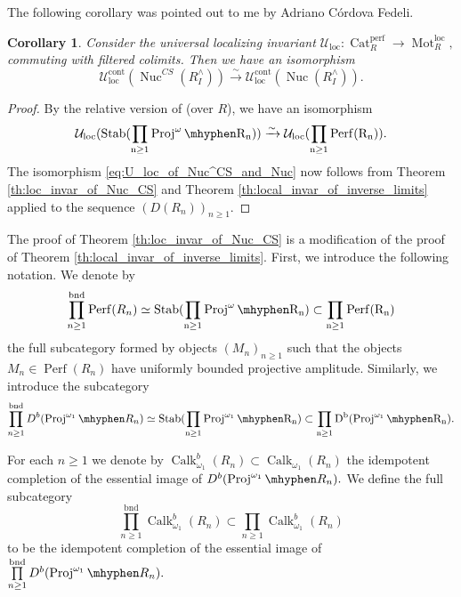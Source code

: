 \documentclass[11pt,leqno]{amsart}
\newtheorem{cor}[theo]{Corollary}
\numberwithin{equation}{section}
\newcommand{\hy}{\mhyphen}
\newcommand{\prodd}[1][]{\mathop{\prod}\limits_{#1}}
\newcommand{\xto}{\xrightarrow}
\newcommand{\bnd}{\operatorname{bnd}}
\newcommand{\Mot}{\operatorname{Mot}}
\newcommand{\Nuc}{\operatorname{Nuc}}
\newcommand{\Proj}{\operatorname{Proj}}
\newcommand{\Cat}{\operatorname{Cat}}
\newcommand{\loc}{\operatorname{loc}}
\newcommand{\cont}{\operatorname{cont}}
\newcommand{\cU}{{\mathcal U}}
\newcommand{\Perf}{\operatorname{Perf}}
\newcommand{\perf}{\operatorname{perf}}
\newcommand{\Calk}{\operatorname{Calk}}
\newcommand{\Stab}{\rm Stab}
\begin{document}
The following corollary was pointed out to me by Adriano C\'ordova Fedeli.

\begin{cor}\label{cor:U_loc_of_Nuc^CS_and_Nuc}
Consider the universal localizing invariant $\cU_{\loc}:\Cat_R^{\perf}\to\Mot^{\loc}_R,$ commuting with filtered colimits. Then we have an isomorphism
\begin{equation}\label{eq:U_loc_of_Nuc^CS_and_Nuc}
\cU_{\loc}^{\cont}(\Nuc^{CS}(R^{\wedge}_I))\xto{\sim}\cU_{\loc}^{\cont}(\Nuc(R^{\wedge}_I)).
\end{equation}
\end{cor}

\begin{proof}
By the relative version of \cite[Proposition 2.10]{Cor} (over $R$), we have an isomorphism
\begin{equation*}
\cU_{\loc}(\Stab(\prodd[n\geq 1]\Proj^{\omega}\hy R_n))\xto{\sim}\cU_{\loc}(\prodd[n\geq 1]\Perf(R_n)).
\end{equation*}
The isomorphism \eqref{eq:U_loc_of_Nuc^CS_and_Nuc} now follows from Theorem \ref{th:loc_invar_of_Nuc_CS} and Theorem \ref{th:local_invar_of_inverse_limits} applied to the sequence $(D(R_n))_{n\geq 1}.$
\end{proof}

The proof of Theorem \ref{th:loc_invar_of_Nuc_CS} is a modification of the proof of Theorem \ref{th:local_invar_of_inverse_limits}. First, we introduce the following notation. We denote by 
\begin{equation*}
\prodd[n\geq 1]^{\bnd}\Perf(R_n)\simeq \Stab(\prodd[n\geq 1]\Proj^{\omega}\hy R_n)\subset \prodd[n\geq 1]\Perf(R_n)
\end{equation*}
the full subcategory formed by objects $(M_n)_{n\geq 1}$ such that the objects $M_n\in\Perf(R_n)$ have uniformly bounded projective amplitude. Similarly, we introduce the subcategory
\begin{equation*}
\prodd[n\geq 1]^{\bnd}D^b(\Proj^{\omega_1}\hy R_n)\simeq \Stab(\prodd[n\geq 1]\Proj^{\omega_1}\hy R_n)\subset \prodd[n\geq 1]D^b(\Proj^{\omega_1}\hy R_n).
\end{equation*}

For each $n\geq 1$ we denote by $\Calk_{\omega_1}^b(R_n)\subset \Calk_{\omega_1}(R_n)$ the idempotent completion of the essential image of $D^b(\Proj^{\omega_1}\hy R_n).$ We define the full subcategory
\begin{equation*}
\prodd[n\geq 1]^{\bnd}\Calk_{\omega_1}^b(R_n)\subset\prodd[n\geq 1]\Calk_{\omega_1}^b(R_n)
\end{equation*}
to be the idempotent completion of the essential image of $\prodd[n\geq 1]^{\bnd}D^b(\Proj^{\omega_1}\hy R_n).$
\end{document}
